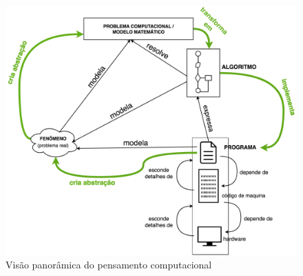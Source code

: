 \begin{figure}
	\caption{Visão panorâmica do pensamento computacional}\label{fig:elos}
	\begin{center}
		\includegraphics[scale=0.30]{imagens/elos}
	\end{center}
\end{figure}











